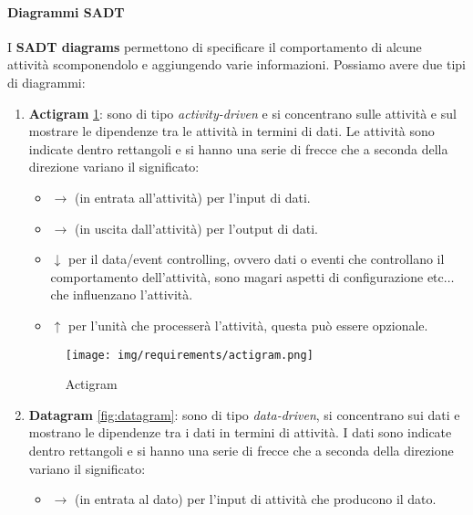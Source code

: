 \paragraph{Diagrammi SADT}
I \textbf{SADT diagrams} permettono di specificare il comportamento di alcune
attività scomponendolo e aggiungendo varie informazioni. Possiamo avere due tipi
di diagrammi:
\begin{enumerate}
      \item \textbf{Actigram} \ref{fig:actigram}: sono di tipo \textit{activity-driven}
            e si concentrano sulle attività e sul mostrare le dipendenze tra le
            attività in termini di dati. Le attività sono indicate dentro
            rettangoli e si hanno una serie di frecce che a seconda della direzione
            variano il significato:
            \begin{itemize}
                  \item $\to$ (in entrata all'attività) per l'input di dati.
                  \item $\to$ (in uscita dall'attività) per l'output di dati.
                  \item $\downarrow$ per il data/event controlling, ovvero dati
                        o eventi che controllano il comportamento dell'attività,
                        sono magari aspetti di configurazione etc$\dots$ che
                        influenzano l'attività.
                  \item $\uparrow$ per l'unità che processerà l'attività, questa
                        può essere opzionale.
            \end{itemize}
            \begin{figure}[!ht]
                  \centering
                  \texttt{[image: img/requirements/actigram.png]}
                  \caption{Actigram}
                  \label{fig:actigram}
            \end{figure}
      \item \textbf{Datagram} \ref{fig:datagram}: sono di tipo \textit{data-driven},
            si concentrano sui dati e mostrano le dipendenze tra i dati in termini
            di attività. I dati sono indicate dentro rettangoli e si hanno una
            serie di frecce che a seconda della direzione variano il significato:
            \begin{itemize}
                  \item $\to$ (in entrata al dato) per l'input di attività che
                        producono il dato.

\end{itemize}
\end{enumerate}

